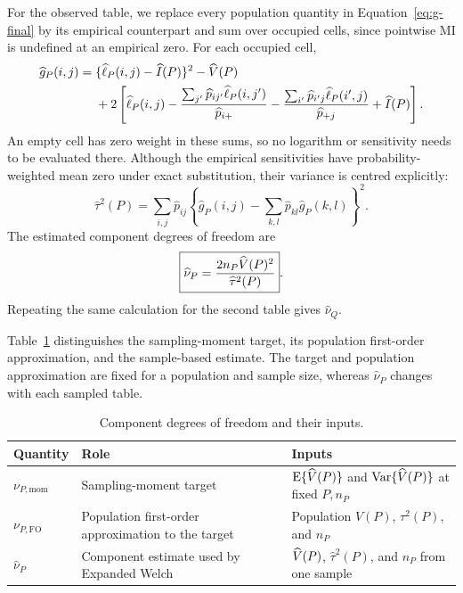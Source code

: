 \medskip
{}

For the observed table, we replace every population quantity in
Equation~\eqref{eq:g-final} by its empirical counterpart and sum over
occupied cells, since pointwise MI is undefined at an empirical zero.
For each occupied cell,
\begin{equation}
\begin{aligned}
\widehat g_P(i,j)
={}&\{\widehat{\ell}_P(i,j)-\widehat I(P)\}^2-\widehat V(P)\\
&+2\left[
\widehat{\ell}_P(i,j)
-\frac{\sum_{j'}\widehat p_{ij'}\widehat{\ell}_P(i,j')}
       {\widehat p_{i+}}
-\frac{\sum_{i'}\widehat p_{i'j}\widehat{\ell}_P(i',j)}
       {\widehat p_{+j}}
+\widehat I(P)
\right].
\end{aligned}
\label{eq:g-hat}
\end{equation}
An empty cell has zero weight in these sums, so no logarithm or sensitivity
needs to be evaluated there. Although the empirical sensitivities have
probability-weighted mean zero under exact substitution, their variance
is centred explicitly:
\begin{equation}
  \widehat\tau^2(P)
  =\sum_{i,j}\widehat p_{ij}
  \left\{\widehat g_P(i,j)
  -\sum_{k,l}\widehat p_{kl}\widehat g_P(k,l)\right\}^2.
  \label{eq:tau-hat}
\end{equation}
The estimated component degrees of freedom are
\begin{equation}
  \boxed{
  \widehat\nu_P
  =\frac{2n_P\widehat V(P)^2}{\widehat\tau^2(P)}
  }.
  \label{eq:nu-p-hat}
\end{equation}
Repeating the same calculation for the second table gives
\(\widehat\nu_Q\).

\medskip
Table~\ref{tab:component-df-roles} distinguishes the sampling-moment target,
its population first-order approximation, and the sample-based estimate.
The target and population approximation are fixed for a population and
sample size, whereas \(\widehat\nu_P\) changes with each sampled table.

\begin{table}[htbp]
\centering
\caption{Component degrees of freedom and their inputs.}
\label{tab:component-df-roles}
\thesistableformat
\begin{tabularx}{\textwidth}{@{}l>{\raggedright\arraybackslash}X>{\raggedright\arraybackslash}X@{}}
\toprule
\textbf{Quantity} & \textbf{Role} & \textbf{Inputs}\\
\midrule
\(\nu_{P,\mathrm{mom}}\) & Sampling-moment target &
\(\operatorname{E}\{\widehat V(P)\}\) and \(\operatorname{Var}\{\widehat V(P)\}\) at fixed \(P,n_P\)\\
\addlinespace
\(\nu_{P,\mathrm{FO}}\) & Population first-order approximation to the target &
Population \(V(P)\), \(\tau^2(P)\), and \(n_P\)\\
\addlinespace
\(\widehat\nu_P\) & Component estimate used by Expanded Welch &
\(\widehat V(P)\), \(\widehat\tau^2(P)\), and \(n_P\) from one sample\\
\bottomrule
\end{tabularx}
\end{table}

